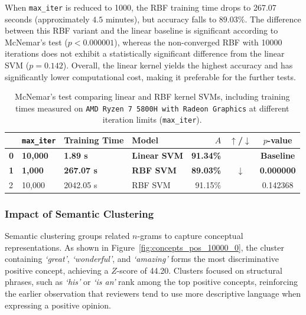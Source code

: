 \documentclass[a4paper,fleqn]{cas-dc}
\newcommand{\accuracy}{A}
\newcommand{\zscore}{Z}
\newcommand{\code}[1]{\texttt{#1}}
\newcommand{\mcnemarp}{p}
\newcommand{\literal}[1]{\textit{`#1'}}
\begin{document}
When \code{max\_iter} is reduced to \num{1000}, the RBF training time drops to \num{267.07} seconds (approximately $4.5$ minutes), but accuracy falls to $89.03\%$.
The difference between this RBF variant and the linear baseline is significant according to McNemar's test ($\mcnemarp < 0.000001$), whereas the non-converged RBF with \num{10000} iterations does not exhibit a statistically significant difference from the linear SVM ($\mcnemarp = 0.142$).
Overall, the linear kernel yields the highest accuracy and has significantly lower computational cost, making it preferable for the further tests.

\begin{table}[tbp]
	\centering
	\caption{McNemar's test comparing linear and RBF kernel SVMs, including training times measured on \code{AMD Ryzen 7 5800H with Radeon Graphics} at different iteration limits (\code{max\_iter}).}
	\label{tab:McNemarSvms}
	\begin{tabular}{llllrcc}
		\toprule
		& \code{max\_iter} & Training Time & Model & $\accuracy$ & $\uparrow$/$\downarrow$ & $\mcnemarp$-value \\
		\midrule
		\textbf{0} & \textbf{10,000} & \textbf{1.89 s} & \textbf{Linear SVM} & \textbf{91.34\%} & \textbf{} & \textbf{Baseline} \\
		\textbf{1} & \textbf{1,000} & \textbf{267.07 s} & \textbf{RBF SVM} & \textbf{89.03\%} & \textbf{$\downarrow$} & \textbf{0.000000} \\
		2 & 10,000 & 2042.05 s & RBF SVM & 91.15\% &  & 0.142368 \\
		\bottomrule
	\end{tabular}
\end{table}

\subsubsection{Impact of Semantic Clustering} \label{sec:Impact-of-Semantic-Clustering}

Semantic clustering groups related $n$-grams to capture conceptual representations. As shown in Figure~\ref{fig:concepts_pos_10000_0}, the cluster containing \literal{great}, \literal{wonderful}, and \literal{amazing} forms the most discriminative positive concept, achieving a $\zscore$-score of \num{44.20}. Clusters focused on structural phrases, such as \literal{his} or \literal{is an} rank among the top positive concepts, reinforcing the earlier observation that reviewers tend to use more descriptive language when expressing a positive opinion.
\end{document}
